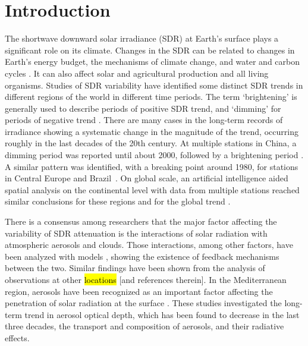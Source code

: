 \documentclass[applsci,article,accept,moreauthors,pdftex]{Definitions/mdpi}
\begin{document}

\hypertarget{introduction}{%
\section{Introduction}\label{introduction}}

The shortwave downward solar irradiance (SDR) at Earth's surface plays a
significant role on its climate. Changes in the SDR can be related to
changes in Earth's energy budget, the mechanisms of climate change, and
water and carbon cycles \citep{Wild2009}. It can also affect solar and
agricultural production and all living organisms. Studies of SDR
variability have identified some distinct SDR trends in different
regions of the world in different time periods. The term `brightening'
is generally used to describe periods of positive SDR trend, and
`dimming' for periods of negative trend \citep{Wild2009}. There are many cases in
the long-term records of irradiance showing a systematic change in the
magnitude of the trend, occurring roughly in the last decades of the
20th century. At multiple stations in China, a dimming period was
reported until about 2000, followed by a brightening period
\citep{Yang2021}. A similar pattern was identified, with a breaking
point around 1980, for stations in Central Europe \citep{Wild2021} and
Brazil~\citep{Yamasoe2021}. On global scale, an artificial intelligence
aided spatial analysis on the continental level with data from multiple
stations reached similar conclusions for these regions and for the
global trend \citep{Yuan2021}.

There is a consensus among researchers that the major factor affecting
the variability of SDR attenuation is the interactions of solar
radiation with atmospheric aerosols and clouds. Those interactions,
among other factors, have been analyzed with models
\citep{Li2016, Samset2018}, showing the existence of feedback mechanisms
between the two. Similar findings have been shown from the analysis of
observations at other \hl{locations} %
 \citep{Schwarz2020, Ohvril2009, Zerefos2009, Xia2007} [and references
therein]. In the
Mediterranean region, aerosols have been recognized as an important
factor affecting the penetration of solar radiation at the surface
\citep{Fountoulakis2016, Siomos2018, Gkikas2013, Lozano2021}. These
studies investigated the long-term trend in aerosol optical depth, which
has been found to decrease in the last three decades, the transport and
composition of aerosols, and their radiative effects.
\end{document}
